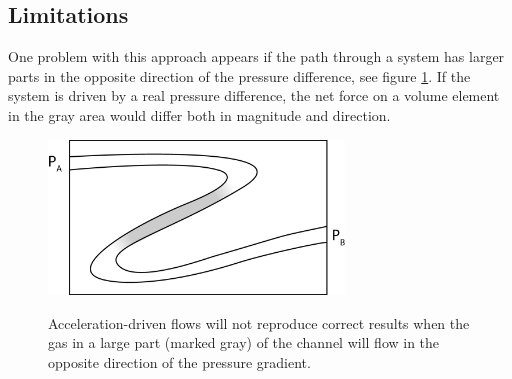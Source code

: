 \subsection{Limitations}
One problem with this approach appears if the path through a system has larger parts in the opposite direction of the pressure difference, see figure \ref{fig:gravity_problem}. If the system is driven by a real pressure difference, the net force on a volume element in the gray area would differ both in magnitude and direction.
\begin{figure}[h]
\begin{center}
\includegraphics[width=0.7\textwidth, trim=0cm 0cm 0cm 0cm, clip]{DSMC/figures/gravity_problem.eps}
\label{fig:gravity_problem}
\end{center}
\caption{Acceleration-driven flows will not reproduce correct results when the gas in a large part (marked gray) of the channel will flow in the opposite direction of the pressure gradient.}
\end{figure}
